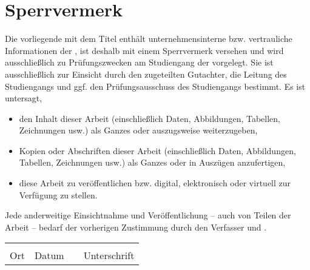 \thispagestyle{empty}
\section*{Sperrvermerk}

\vspace*{2em}

  Die vorliegende {\vartype} mit dem Titel {\itshape{} \vartitle{}\/} enthält unternehmensinterne bzw. vertrauliche Informationen der {\varcompany}, ist deshalb mit einem Sperrvermerk versehen und wird ausschließlich zu Prüfungszwecken am Studiengang {\varcourseofstudies} der {\varuniversity} vorgelegt. Sie ist ausschließlich zur Einsicht durch den zugeteilten Gutachter, die Leitung des Studiengangs und ggf. den Prüfungsausschuss des Studiengangs bestimmt.  Es ist untersagt,
  \begin{itemize}
  \item den Inhalt dieser Arbeit (einschließlich Daten, Abbildungen, Tabellen, Zeichnungen usw.) als Ganzes oder auszugsweise weiterzugeben,
  \item Kopien oder Abschriften dieser Arbeit (einschließlich Daten, Abbildungen, Tabellen, Zeichnungen usw.) als Ganzes oder in Auszügen anzufertigen,
  \item diese Arbeit zu veröffentlichen bzw. digital, elektronisch oder virtuell zur Verfügung zu stellen. 
  \end{itemize}
Jede anderweitige Einsichtnahme und Veröffentlichung – auch von Teilen der Arbeit – bedarf der vorherigen Zustimmung durch den Verfasser und {\varcompany}.

\vspace{3em}

\begin{tabular}{ p{3cm}p{3cm}p{1cm}p{5cm} }
        \hrulefill & \hrulefill & & \hrulefill\\
        Ort & Datum & & Unterschrift\\
\end{tabular}
